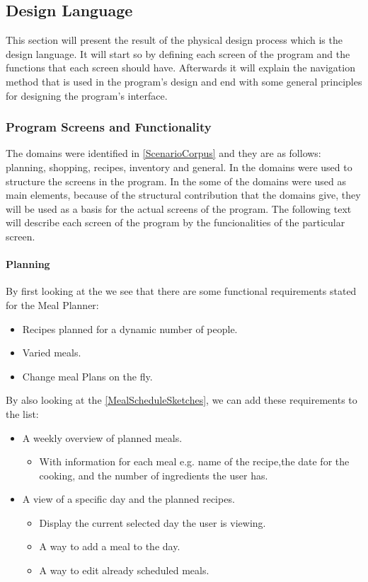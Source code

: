 \subsection{Design Language} \label{DesignLanguage}
This section will present the result of the physical design process which is the design language. It will start so by defining each screen of the program and the  functions that each screen should have. Afterwards it will explain the navigation method that is used in the program's design and end with some general principles for designing the program's interface.

\subsubsection{Program Screens and Functionality} \label{ScreensandFunctionality}
The domains were identified in \cref{ScenarioCorpus} and they are as follows: planning, shopping, recipes, inventory and general. In  the domains were used to structure the screens in the program. In the  some of the domains were used as main elements, because of the structural contribution that the domains give, they will be used as a basis for the actual screens of the program. The following text will describe each screen of the program by the funcionalities of the particular screen.

\paragraph{Planning}
By first looking at the  we see that there are some functional requirements stated for the Meal Planner:

\begin{itemize}
\item Recipes planned for a dynamic number of people.
\item Varied meals.
\item Change meal Plans on the fly.
\end{itemize}  

By also looking at the  \cref{MealScheduleSketches}, we can add these requirements to the list:

\begin{itemize}
	\item A weekly overview of planned meals.
		\begin{itemize}
			\item With information  for each meal e.g. name of the recipe,the date for the cooking, and the number of ingredients the user has.
		\end{itemize}
	\item A view of a specific day and the planned recipes.
		\begin{itemize}
			\item Display the current selected day the user is viewing.
			\item A way to add a meal to the day.
			\item A way to edit already scheduled meals.
		\end{itemize}  
\end{itemize} 

